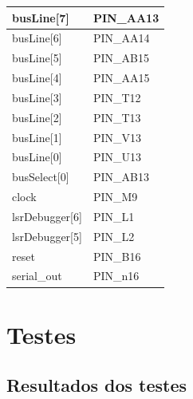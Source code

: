 \documentclass[12pt, a4paper]{article}
\begin{document}
	
	\begin{table}[H]
		\begin{center}
			\begin{tabular}{|l|l|}
				\hline
				busLine{[}7{]}     & PIN\_AA13 \\ \hline
				busLine{[}6{]}     & PIN\_AA14 \\ \hline
				busLine{[}5{]}     & PIN\_AB15 \\ \hline
				busLine{[}4{]}     & PIN\_AA15 \\ \hline
				busLine{[}3{]}     & PIN\_T12  \\ \hline
				busLine{[}2{]}     & PIN\_T13  \\ \hline
				busLine{[}1{]}     & PIN\_V13  \\ \hline
				busLine{[}0{]}     & PIN\_U13  \\ \hline
				busSelect{[}0{]}   & PIN\_AB13 \\ \hline
				clock              & PIN\_M9   \\ \hline
				lsrDebugger{[}6{]} & PIN\_L1   \\ \hline
				lsrDebugger{[}5{]} & PIN\_L2   \\ \hline
				reset              & PIN\_B16  \\ \hline
				serial\_out        & PIN\_n16  \\ \hline
			\end{tabular}
		\end{center}
	\end{table}
	
	
	
	\section*{Testes}
	
	\subsection*{Resultados dos testes}
\end{document}
